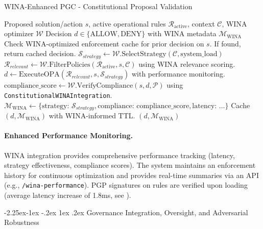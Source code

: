 \documentclass[manuscript,screen,9pt]{acmart}
\makeatletter
\renewcommand\subsection{\@startsection{subsection}{2}{\z@}%
  {-2.25ex\@plus -1ex \@minus -.2ex}%
  {1ex \@plus .2ex}%
  {\normalfont\large\bfseries}}
\makeatother
\begin{document}
\begin{algorithm}[!htbp]
\caption{WINA-Enhanced PGC - Constitutional Proposal Validation}
\label{alg:wina_pgc_validation}
\begin{algorithmic}[1]
\Require Proposed solution/action $s$, active operational rules $\mathcal{R}_{\text{active}}$, context $\mathcal{C}$, WINA optimizer $\mathcal{W}$
\Ensure Decision $d \in \{\text{ALLOW}, \text{DENY}\}$ with WINA metadata $\mathcal{M}_{\text{WINA}}$
    \State Check WINA-optimized enforcement cache for prior decision on $s$. If found, return cached decision.
    \State $\mathcal{S}_{strategy} \gets \mathcal{W}.\text{SelectStrategy}(\mathcal{C}, \text{system\_load})$ 
    \State $\mathcal{R}_{relevant} \gets \mathcal{W}.\text{FilterPolicies}(\mathcal{R}_{\text{active}}, s, \mathcal{C})$ using WINA relevance scoring.
    \State $d \gets \text{ExecuteOPA}(\mathcal{R}_{relevant}, s, \mathcal{S}_{strategy})$ with performance monitoring.
    \State $\text{compliance\_score} \gets \mathcal{W}.\text{VerifyCompliance}(s, d, \mathcal{P})$ using \texttt{ConstitutionalWINAIntegration}.
    \State $\mathcal{M}_{\text{WINA}} \gets \{\text{strategy: } \mathcal{S}_{strategy}, \text{compliance: } \text{compliance\_score}, \text{latency: } \dots \}$
    \State Cache $(d, \mathcal{M}_{\text{WINA}})$ with WINA-informed TTL.
    \State \Return $(d, \mathcal{M}_{\text{WINA}})$
\EndFunction
\end{algorithmic}
\end{algorithm}

\paragraph{Enhanced Performance Monitoring.} WINA integration provides comprehensive performance tracking (latency, strategy effectiveness, compliance scores). The system maintains an enforcement history for continuous optimization and provides real-time summaries via an API (e.g., \texttt{/wina-performance}). PGP signatures on rules are verified upon loading (average latency increase of 1.8ms, see ).

\subsection{Governance Integration, Oversight, and Adversarial Robustness}
\label{subsec:governance_integration_oversight_robustness} 
\end{document}

